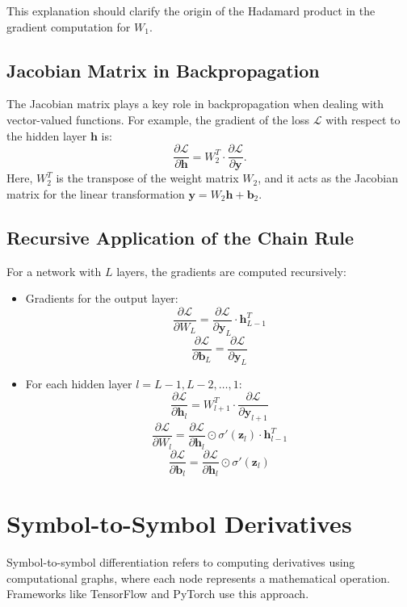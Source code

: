\begin{notechapter}
This explanation should clarify the origin of the Hadamard product in the gradient computation for \( W_1 \).

\subsection{Jacobian Matrix in Backpropagation}
The Jacobian matrix plays a key role in backpropagation when dealing with vector-valued functions. For example, the gradient of the loss \( \mathcal{L} \) with respect to the hidden layer \( \mathbf{h} \) is:
\[
\frac{\partial \mathcal{L}}{\partial \mathbf{h}} = W_2^T \cdot \frac{\partial \mathcal{L}}{\partial \mathbf{y}}.
\]
Here, \( W_2^T \) is the transpose of the weight matrix \( W_2 \), and it acts as the Jacobian matrix for the linear transformation \( \mathbf{y} = W_2 \mathbf{h} + \mathbf{b}_2 \).

\subsection{Recursive Application of the Chain Rule}
For a network with \( L \) layers, the gradients are computed recursively:
\begin{itemize}
    \item Gradients for the output layer:
    \[
    \frac{\partial \mathcal{L}}{\partial W_L} = \frac{\partial \mathcal{L}}{\partial \mathbf{y}_L} \cdot \mathbf{h}_{L-1}^T
    \]
    \[
    \frac{\partial \mathcal{L}}{\partial \mathbf{b}_L} = \frac{\partial \mathcal{L}}{\partial \mathbf{y}_L}
    \]
    \item For each hidden layer \( l = L-1, L-2, \dots, 1 \):
    \[
    \frac{\partial \mathcal{L}}{\partial \mathbf{h}_l} = W_{l+1}^T \cdot \frac{\partial \mathcal{L}}{\partial \mathbf{y}_{l+1}}
    \]
    \[
    \frac{\partial \mathcal{L}}{\partial W_l} = \frac{\partial \mathcal{L}}{\partial \mathbf{h}_l} \odot \sigma'(\mathbf{z}_l) \cdot \mathbf{h}_{l-1}^T
    \]
    \[
    \frac{\partial \mathcal{L}}{\partial \mathbf{b}_l} = \frac{\partial \mathcal{L}}{\partial \mathbf{h}_l} \odot \sigma'(\mathbf{z}_l)
    \]
\end{itemize}

\section{Symbol-to-Symbol Derivatives}
Symbol-to-symbol differentiation refers to computing derivatives using computational graphs, where each node represents a mathematical operation. Frameworks like TensorFlow and PyTorch use this approach.


\end{notechapter}
